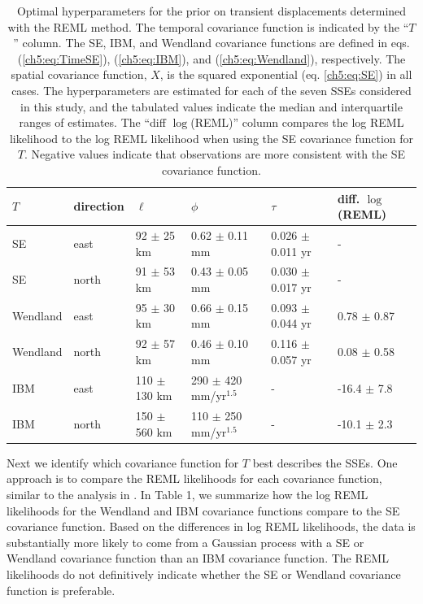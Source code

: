 \begin{table}\label{ch5:tab:Parameters}
\caption{Optimal hyperparameters for the prior on transient
displacements determined with the REML method. The temporal covariance
function is indicated by the ``$T$'' column. The SE, IBM, and Wendland
covariance functions are defined in eqs. (\ref{ch5:eq:TimeSE}),
(\ref{ch5:eq:IBM}), and (\ref{ch5:eq:Wendland}), respectively. The
spatial covariance function, $X$, is the squared exponential (eq.
\ref{ch5:eq:SE}) in all cases. The hyperparameters are estimated for
each of the seven SSEs considered in this study, and the tabulated
values indicate the median and interquartile ranges of estimates. The
``diff $\log$(REML)'' column compares the log REML likelihood to the
log REML likelihood when using the SE covariance function for $T$.
Negative values indicate that observations are more consistent with
the SE covariance function.}
\begin{tabular} {l l l l l l}
$T$ & direction & $\ell$  & $\phi$   & $\tau$  & diff. $\log$(REML) \\ \hline
SE & east   & 92 $\pm$ 25 km  & 0.62 $\pm$ 0.11 mm  & 0.026 $\pm$ 0.011 yr  &  - \\
SE & north  & 91 $\pm$ 53 km  & 0.43 $\pm$ 0.05 mm  & 0.030 $\pm$ 0.017 yr  &  - \\
Wendland & east   & 95 $\pm$ 30 km  & 0.66 $\pm$ 0.15 mm  & 0.093 $\pm$ 0.044 yr &  0.78 $\pm$ 0.87 \\
Wendland & north  & 92 $\pm$ 57 km  & 0.46 $\pm$ 0.10 mm  & 0.116 $\pm$ 0.057 yr &  0.08 $\pm$ 0.58 \\
IBM & east   & 110 $\pm$ 130 km & 290 $\pm$ 420 mm/yr$^{1.5}$  & -          & -16.4 $\pm$ 7.8 \\
IBM & north  & 150 $\pm$ 560 km & 110 $\pm$ 250 mm/yr$^{1.5}$ & -           & -10.1 $\pm$ 2.3 \\
\end{tabular}
\end{table}

Next we identify which covariance function for $T$ best describes the
SSEs. One approach is to compare the REML likelihoods for each
covariance function, similar to the analysis in \citet{Langbein2004}.
In Table 1, we summarize how the log REML likelihoods for the Wendland
and IBM covariance functions compare to the SE covariance function.
Based on the differences in log REML likelihoods, the data is
substantially more likely to come from a Gaussian process with a SE or
Wendland covariance function than an IBM covariance function. The REML
likelihoods do not definitively indicate whether the SE or Wendland
covariance function is preferable.

